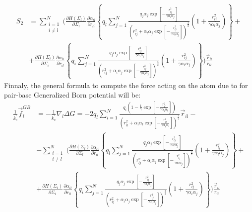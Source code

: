 \documentclass[11pt]{book}
\begin{document}
\begin{equation}\label{eq:gb-s2-4}
\begin{split}
S_{2}&=\sum_{\substack{i=1\\i\ne l}}^{N}\Bigg(\frac{\partial H(\Sigma_{l})}{\partial \Sigma_{l}}\frac{\partial \alpha_{li}}{\partial r_{li}}\left\{q_{l}\sum_{j=1}^{N}\frac{q_{j}\alpha_{j}\exp{\left[-\frac{r_{lj}^{2}}{\gamma\alpha_{l}\alpha_{j}}\right]}}{\left(r_{lj}^{2}+\alpha_{l}\alpha_{j}\exp{\left[-\frac{r_{lj}^{2}}{\gamma\alpha_{l}\alpha_{j}}\right]}\right)^{\frac{3}{2}}}\left(1+\frac{r_{lj}^{2}}{\gamma\alpha_{l}\alpha_{j}}\right)\right\}+\\
&+\frac{\partial H(\Sigma_{i})}{\partial \Sigma_{i}}\frac{\partial \alpha_{il}}{\partial r_{il}}\left\{q_{i}\sum_{j=1}^{N}\frac{q_{j}\alpha_{j}\exp{\left[-\frac{r_{ij}^{2}}{\gamma\alpha_{i}\alpha_{j}}\right]}}{\left(r_{ij}^{2}+\alpha_{i}\alpha_{j}\exp{\left[-\frac{r_{ij}^{2}}{\gamma\alpha_{i}\alpha_{j}}\right]}\right)^{\frac{3}{2}}}\left(1+\frac{r_{ij}^{2}}{\gamma\alpha_{i}\alpha_{j}}\right)\right\}\Bigg)\frac{\vec{r}_{il}}{r_{il}}
\end{split}
\end{equation}
Finnaly, the general formula to compute the force acting on the atom due to for pair-base Generalized Born potential will be:
\begin{equation}\label{eq:gb-f-1}
\begin{split}
\frac{1}{k_{c}^{\prime}}\vec{f}_{l}^{GB}&=-\frac{1}{k_{c}^{\prime}}\nabla_{l}\Delta G = -2q_{l}\sum_{i=1}^{N}\frac{q_{i}\left(1-\frac{1}{\gamma}\exp{\left[-\frac{r_{il}^{2}}{\gamma\alpha_{i}\alpha_{l}}\right]}\right)}{\left(r_{il}^{2}+\alpha_{i}\alpha_{l}\exp{\left[-\frac{r_{il}^{2}}{\gamma\alpha_{i}\alpha_{l}}\right]}\right)^{\frac{3}{2}}}\vec{r}_{il}-\\
&-\sum_{\substack{i=1\\i\ne l}}^{N}\Bigg(\frac{\partial H(\Sigma_{l})}{\partial \Sigma_{l}}\frac{\partial \alpha_{li}}{\partial r_{li}}\left\{q_{l}\sum_{j=1}^{N}\frac{q_{j}\alpha_{j}\exp{\left[-\frac{r_{lj}^{2}}{\gamma\alpha_{l}\alpha_{j}}\right]}}{\left(r_{lj}^{2}+\alpha_{l}\alpha_{j}\exp{\left[-\frac{r_{lj}^{2}}{\gamma\alpha_{l}\alpha_{j}}\right]}\right)^{\frac{3}{2}}}\left(1+\frac{r_{lj}^{2}}{\gamma\alpha_{l}\alpha_{j}}\right)\right\}+\\
&+\frac{\partial H(\Sigma_{i})}{\partial \Sigma_{i}}\frac{\partial \alpha_{il}}{\partial r_{il}}\left\{q_{i}\sum_{j=1}^{N}\frac{q_{j}\alpha_{j}\exp{\left[-\frac{r_{ij}^{2}}{\gamma\alpha_{i}\alpha_{j}}\right]}}{\left(r_{ij}^{2}+\alpha_{i}\alpha_{j}\exp{\left[-\frac{r_{ij}^{2}}{\gamma\alpha_{i}\alpha_{j}}\right]}\right)^{\frac{3}{2}}}\left(1+\frac{r_{ij}^{2}}{\gamma\alpha_{i}\alpha_{j}}\right)\right\}\Bigg)\frac{\vec{r}_{il}}{r_{il}}
\end{split}
\end{equation}
\end{document}
